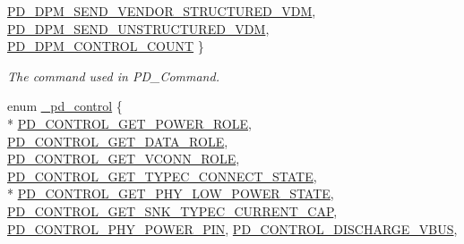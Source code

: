 \begin{DoxyCompactItemize}
\hyperlink{group__usb__pd__stack_ggabf2676c3360b7c572954ae09c0a5e46aa436be299ae6338153908ef5b59d5f84e}{P\-D\-\_\-\-D\-P\-M\-\_\-\-S\-E\-N\-D\-\_\-\-V\-E\-N\-D\-O\-R\-\_\-\-S\-T\-R\-U\-C\-T\-U\-R\-E\-D\-\_\-\-V\-D\-M}, 
\hyperlink{group__usb__pd__stack_ggabf2676c3360b7c572954ae09c0a5e46aaa91f5407fe2e9e626a11c16f151dced1}{P\-D\-\_\-\-D\-P\-M\-\_\-\-S\-E\-N\-D\-\_\-\-U\-N\-S\-T\-R\-U\-C\-T\-U\-R\-E\-D\-\_\-\-V\-D\-M}, 
\hyperlink{group__usb__pd__stack_ggabf2676c3360b7c572954ae09c0a5e46aa5eca4c7abaa74e09ff6d747c4eb73c7c}{P\-D\-\_\-\-D\-P\-M\-\_\-\-C\-O\-N\-T\-R\-O\-L\-\_\-\-C\-O\-U\-N\-T}
 \}
\begin{DoxyCompactList}\small\item\em The command used in P\-D\-\_\-\-Command. \end{DoxyCompactList}\item 
enum \hyperlink{group__usb__pd__stack_ga0edd2a390d28d96646bc71aac1858af1}{\-\_\-pd\-\_\-control} \{ \\*
\hyperlink{group__usb__pd__stack_gga0edd2a390d28d96646bc71aac1858af1a04f2cae987c5f93bcd07bcffd679548e}{P\-D\-\_\-\-C\-O\-N\-T\-R\-O\-L\-\_\-\-G\-E\-T\-\_\-\-P\-O\-W\-E\-R\-\_\-\-R\-O\-L\-E}, 
\hyperlink{group__usb__pd__stack_gga0edd2a390d28d96646bc71aac1858af1a06f4d2e5460a98f33e36db26ee0576cf}{P\-D\-\_\-\-C\-O\-N\-T\-R\-O\-L\-\_\-\-G\-E\-T\-\_\-\-D\-A\-T\-A\-\_\-\-R\-O\-L\-E}, 
\hyperlink{group__usb__pd__stack_gga0edd2a390d28d96646bc71aac1858af1a157e80a587dd98e5cd78e9927b4c4994}{P\-D\-\_\-\-C\-O\-N\-T\-R\-O\-L\-\_\-\-G\-E\-T\-\_\-\-V\-C\-O\-N\-N\-\_\-\-R\-O\-L\-E}, 
\hyperlink{group__usb__pd__stack_gga0edd2a390d28d96646bc71aac1858af1ad8f600ed0992d656036ca0a272d680ad}{P\-D\-\_\-\-C\-O\-N\-T\-R\-O\-L\-\_\-\-G\-E\-T\-\_\-\-T\-Y\-P\-E\-C\-\_\-\-C\-O\-N\-N\-E\-C\-T\-\_\-\-S\-T\-A\-T\-E}, 
\\*
\hyperlink{group__usb__pd__stack_gga0edd2a390d28d96646bc71aac1858af1aa58ce53ecaeed9f620eda031d4e5f342}{P\-D\-\_\-\-C\-O\-N\-T\-R\-O\-L\-\_\-\-G\-E\-T\-\_\-\-P\-H\-Y\-\_\-\-L\-O\-W\-\_\-\-P\-O\-W\-E\-R\-\_\-\-S\-T\-A\-T\-E}, 
\hyperlink{group__usb__pd__stack_gga0edd2a390d28d96646bc71aac1858af1a16509ea70890f75b3f97c5af3e7e04d5}{P\-D\-\_\-\-C\-O\-N\-T\-R\-O\-L\-\_\-\-G\-E\-T\-\_\-\-S\-N\-K\-\_\-\-T\-Y\-P\-E\-C\-\_\-\-C\-U\-R\-R\-E\-N\-T\-\_\-\-C\-A\-P}, 
\hyperlink{group__usb__pd__stack_gga0edd2a390d28d96646bc71aac1858af1a219d3fe217c5bf11a8126d09ee9fdb0c}{P\-D\-\_\-\-C\-O\-N\-T\-R\-O\-L\-\_\-\-P\-H\-Y\-\_\-\-P\-O\-W\-E\-R\-\_\-\-P\-I\-N}, 
\hyperlink{group__usb__pd__stack_gga0edd2a390d28d96646bc71aac1858af1ab4baaafc5cca20f365d103a948261b1f}{P\-D\-\_\-\-C\-O\-N\-T\-R\-O\-L\-\_\-\-D\-I\-S\-C\-H\-A\-R\-G\-E\-\_\-\-V\-B\-U\-S}, 

\end{DoxyCompactItemize}
